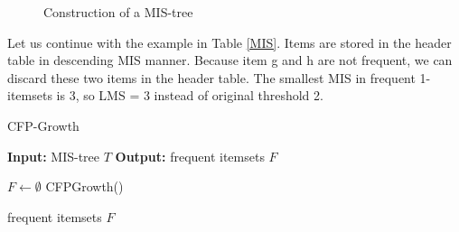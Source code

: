 \documentclass[conference]{IEEEtran}
\begin{document}
\begin{figure}[t]
    \label{A MIS-Tree}
\caption{Construction of a MIS-tree}
\end{figure}

\begin{example}
Let us continue with the example in Table \ref{MIS}.
Items are stored in the header table in descending MIS manner. 
Because item g and h are not frequent, we can discard these two items in the header table. 
The smallest MIS in frequent 1-itemsets is 3, so LMS = 3 instead of original threshold 2. 


\end{example}

\begin{algorithm}[htbp]
    \caption{CFP-Growth}
    \hspace*{0.02in} {\bf Input:} %
    MIS-tree $T$
    \hspace*{0.02in} {\bf Output:} %
    frequent itemsets $F$
    \begin{algorithmic}[1]
        \State $F\leftarrow \emptyset$
        \State CFPGrowth()
        
    \State \Return frequent itemsets $F$
    \end{algorithmic} 
    \label{alg5}
\end{algorithm}
\end{document}
